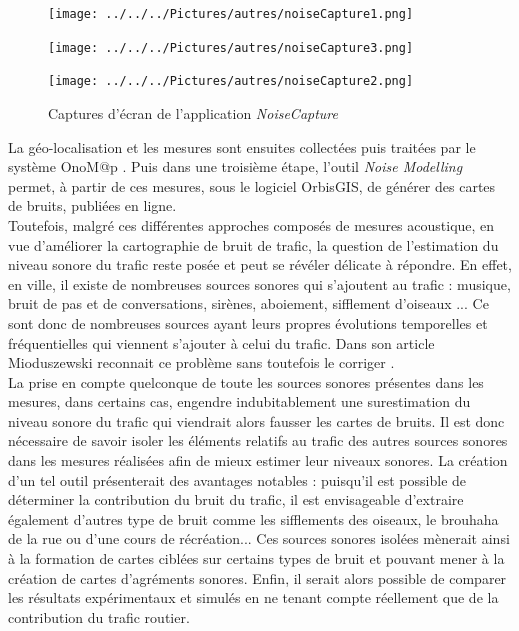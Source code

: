 \begin{figure}
\begin{center}
    \begin{minipage}[t]{0.3\textwidth}
        \centering
        \texttt{[image: ../../../Pictures/autres/noiseCapture1.png]}
    \end{minipage}
    \begin{minipage}[t]{0.3\textwidth}
        \centering
        \texttt{[image: ../../../Pictures/autres/noiseCapture3.png]}
    \end{minipage}
    \begin{minipage}[t]{0.3\textwidth}
        \centering
        \texttt{[image: ../../../Pictures/autres/noiseCapture2.png]}
    \end{minipage}
    \caption{Captures d'écran de l'application \textit{NoiseCapture}}
\end{center}
\end{figure}


La géo-localisation et les mesures sont ensuites collectées puis traitées par le système OnoM@p \cite{bocher_onomp_2016}. Puis dans une troisième étape, l'outil \textit{Noise Modelling} permet, à partir de ces mesures, sous le logiciel OrbisGIS, de générer des cartes de bruits, publiées en ligne.\\

Toutefois, malgré ces différentes approches composés de mesures acoustique, en vue d'améliorer la cartographie de bruit de trafic, la question de l'estimation du niveau sonore du trafic reste posée et peut se révéler délicate à répondre. En effet, en ville, il existe de nombreuses sources sonores qui s'ajoutent au trafic : musique, bruit de pas et de conversations, sirènes, aboiement, sifflement d'oiseaux ... Ce sont donc de nombreuses sources ayant leurs propres évolutions temporelles et fréquentielles qui viennent s'ajouter à celui du trafic. Dans son article Mioduszewski reconnait ce problème sans toutefois le corriger \cite{Mioduszewski}.\\

La prise en compte quelconque de toute les sources sonores présentes dans les mesures, dans certains cas, engendre indubitablement une surestimation du niveau sonore du trafic qui viendrait alors fausser les cartes de bruits. Il est donc nécessaire de savoir isoler les éléments relatifs au trafic des autres sources sonores dans les mesures réalisées afin de mieux estimer leur niveaux sonores. La création d'un tel outil présenterait des avantages notables : puisqu'il est possible de déterminer la contribution du bruit du trafic, il est envisageable d'extraire également d'autres type de bruit comme les sifflements des oiseaux, le brouhaha de la rue ou d'une cours de récréation... Ces sources sonores isolées mènerait ainsi à la formation de cartes ciblées sur certains types de bruit et pouvant mener à la création de cartes d'agréments sonores. Enfin, il serait alors possible de comparer les résultats expérimentaux et simulés en ne tenant compte réellement que de la contribution du trafic routier.

%
%
%
% 